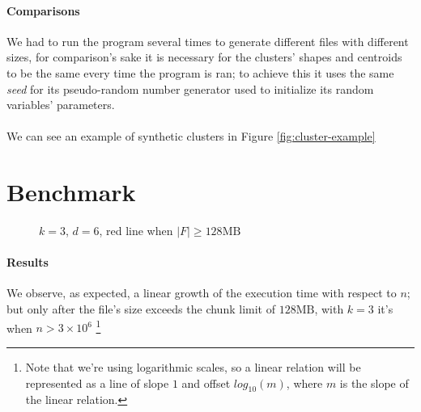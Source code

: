 \documentclass[parskip=full]{report}
\begin{document}
\paragraph{Comparisons}
We had to run the program several times to generate different files with 
different sizes, for comparison's sake it is necessary for the clusters' shapes 
and centroids to be the same every time the program is ran; to achieve this it 
uses the same  \emph{seed} for its pseudo-random number generator used to 
initialize its random variables' parameters.

\paragraph{}
We can see an example of synthetic clusters in Figure \ref{fig:cluster-example}

\section{Benchmark}

\begin{figure}[H]
	\centering
	\caption{$k=3$, $d=6$, red line when $|F| \ge 128\text{MB}$}
\end{figure}

\paragraph{Results}
We observe, as expected, a linear growth of the execution time with respect to 
$n$; but only after the file's size exceeds the chunk limit of $128\text{MB}$, 
with $k = 3$ it's when $n > 3 \times 10^6$
\footnote{
	Note that we're using 
	logarithmic scales, so a linear relation will 
	be represented as a line of slope $1$ and offset $log_{10}(m)$, where $m$ 
	is the slope of the linear relation.
}
\end{document}
